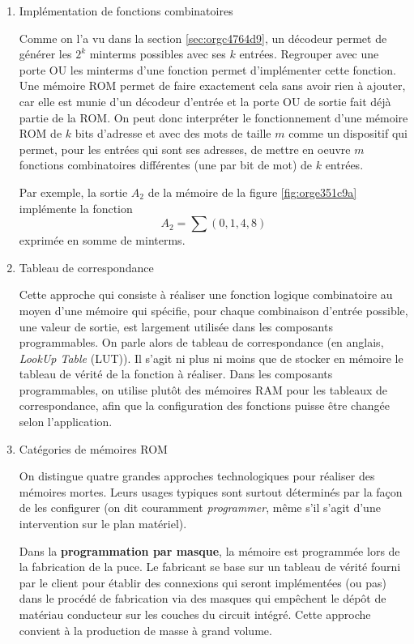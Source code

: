 \documentclass[letter, oneside]{book}
\begin{document}
\begin{enumerate}
\item Implémentation de fonctions combinatoires
\label{sec:org61b0bd2}

Comme on l'a vu dans la section \ref{sec:orgc4764d9}, un décodeur permet de
générer les \(2^k\) minterms possibles avec ses \(k\)
entrées. Regrouper avec une porte OU les minterms d'une
fonction permet d'implémenter cette fonction. Une mémoire ROM permet
de faire exactement cela sans avoir rien à ajouter, car elle est munie
d'un décodeur d'entrée et la porte OU de sortie fait déjà partie de
la ROM. On peut donc interpréter le fonctionnement d'une mémoire ROM
de \(k\) bits d'adresse et avec des mots de taille \(m\) comme un
dispositif qui permet, pour les entrées qui sont ses adresses, de
mettre en oeuvre \(m\) fonctions combinatoires différentes (une par
bit de mot) de \(k\) entrées.

Par exemple, la sortie \(A_2\) de la mémoire de la figure
\ref{fig:orge351c9a} implémente la fonction $$ A_2 = \sum (0,1,4,8) $$
exprimée en somme de minterms.

\item Tableau de correspondance
\label{sec:org6bb92cb}

Cette approche qui consiste à réaliser une fonction logique
combinatoire au moyen d'une mémoire qui spécifie, pour chaque
combinaison d'entrée possible, une valeur de sortie, est largement
utilisée dans les composants programmables. On parle alors de tableau
de correspondance (en anglais, \emph{LookUp Table} (LUT)). Il s'agit ni
plus ni moins que de stocker en mémoire le tableau de vérité de la
fonction à réaliser. Dans les composants programmables, on utilise
plutôt des mémoires RAM pour les tableaux de correspondance, afin que
la configuration des fonctions puisse être changée selon
l'application.

\item Catégories de mémoires ROM
\label{sec:org15f0d02}

On distingue quatre grandes approches technologiques pour réaliser des
mémoires mortes. Leurs usages typiques sont surtout déterminés par la
façon de les configurer (on dit couramment \emph{programmer}, même s'il
s'agit d'une intervention sur le plan matériel).

Dans la \textbf{programmation par masque}, la mémoire est programmée lors de
la fabrication de la puce. Le fabricant se base sur un tableau de
vérité fourni par le client pour établir des connexions qui seront
implémentées (ou pas) dans le procédé de fabrication via des masques
qui empêchent le dépôt de matériau conducteur sur les couches du
circuit intégré.  Cette approche convient à la production de masse à
grand volume.


\end{enumerate}
\end{document}
